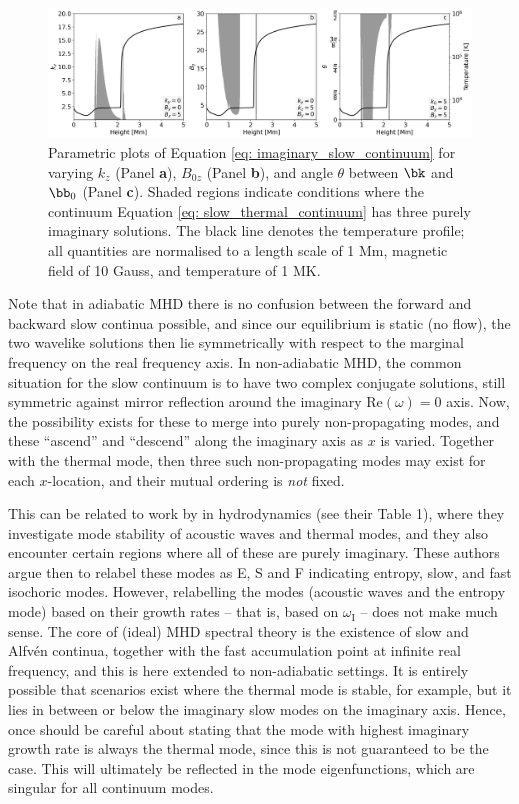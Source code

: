 \begin{figure}[t]
  \centering
  \includegraphics[width=\textwidth]{imaginarysolutions.png}
  \caption{
    Parametric plots of Equation \eqref{eq: imaginary_slow_continuum} for varying $k_z$ (Panel \textbf{a}),
    $B_{0z}$ (Panel \textbf{b}), and angle $\theta$ between $\bk$ and $\bb_0$ (Panel \textbf{c}). Shaded regions indicate conditions where the continuum Equation \eqref{eq: slow_thermal_continuum} has three purely imaginary solutions. The black line denotes the temperature profile; all quantities are normalised to a length scale of 1 Mm, magnetic field of 10 Gauss, and temperature of 1 MK.
  }
  \label{fig: parametric_imaginary}
\end{figure}

Note that in adiabatic MHD there is no confusion between the forward and backward slow continua possible, and since our equilibrium is static (no flow), the two wavelike solutions then lie symmetrically with respect to the marginal frequency on the real frequency axis. In non-adiabatic MHD, the common situation for the slow continuum is to have two complex conjugate solutions, still symmetric against mirror reflection around the imaginary Re$(\omega) = 0$ axis. Now, the possibility exists for these to merge into purely non-propagating modes, and these ``ascend'' and ``descend'' along the imaginary axis as $x$ is varied. Together with the thermal mode, then three such non-propagating modes may exist for each $x$-location, and their mutual ordering is \emph{not} fixed.

This can be related to work by \citet{waters2019} in hydrodynamics (see their Table 1), where they investigate mode stability of acoustic waves and thermal modes, and they also encounter certain regions where all of these are purely imaginary. These authors argue then to relabel these modes as E, S and F indicating entropy, slow, and fast isochoric modes. However, relabelling the modes (acoustic waves and the entropy mode) based on their growth rates -- that is, based on $\omega_\text{I}$ -- does not make much sense. The core of (ideal) MHD spectral theory is the existence of slow and Alfv\'en continua, together with the fast accumulation point at infinite real frequency, and this is here extended to non-adiabatic settings. It is entirely possible that scenarios exist where the thermal mode is stable, for example, but it lies in between or below the imaginary slow modes on the imaginary axis. Hence, once should be careful about stating that the mode with highest imaginary growth rate is always the thermal mode, since this is not guaranteed to be the case. This will ultimately be reflected in the mode eigenfunctions, which are singular for all continuum modes.

